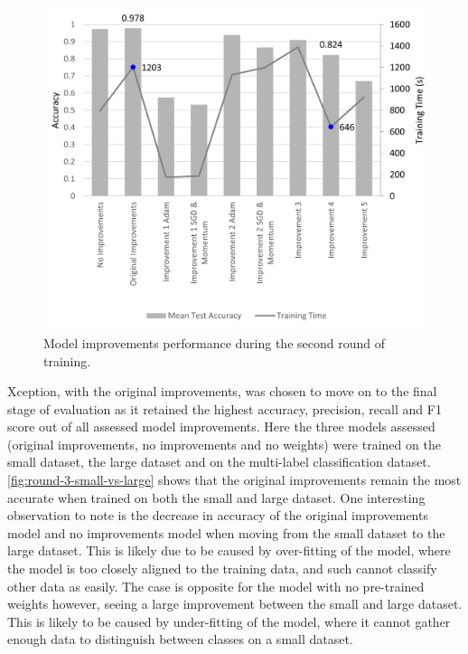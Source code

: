 \begin{figure}[H]
    \centering
    \includegraphics[width=\textwidth]{figures/round-2-accuracy-training.png}
    \caption{Model improvements performance during the second round of training.}
    \label{fig:round-2-accuracy-training}
\end{figure}

Xception, with the original improvements, was chosen to move on to the final stage of evaluation as it retained the highest accuracy, precision, recall and F1 score out of all assessed model improvements. Here the three models assessed (original improvements, no improvements and no weights) were trained on the small dataset, the large dataset and on the multi-label classification dataset. \autoref{fig:round-3-small-vs-large} shows that the original improvements remain the most accurate when trained on both the small and large dataset. One interesting observation to note is the decrease in accuracy of the original improvements model and no improvements model when moving from the small dataset to the large dataset. This is likely due to be caused by over-fitting of the model, where the model is too closely aligned to the training data, and such cannot classify other data as easily. The case is opposite for the model with no pre-trained weights however, seeing a large improvement between the small and large dataset. This is likely to be caused by under-fitting of the model, where it cannot gather enough data to distinguish between classes on a small dataset.

